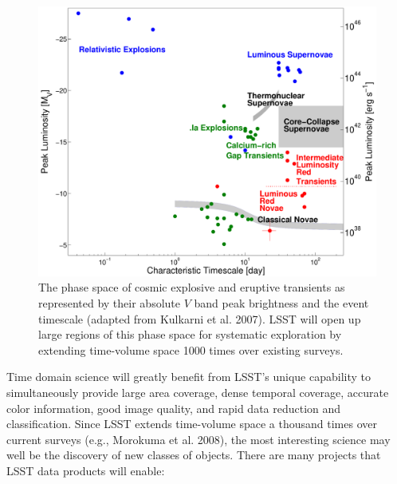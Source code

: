\documentclass{emulateapj}
\begin{document}
\begin{figure}
\hskip -0.1in
\vskip -0.1in
\includegraphics[width=1.0\hsize,clip]{taumv.pdf}
\caption{The phase space of cosmic explosive and eruptive transients as
represented by their absolute $V$ band peak brightness and the 
event timescale (adapted from Kulkarni et al. 2007). LSST will open up large 
regions of this phase space for systematic exploration by extending
time-volume space 1000 times over existing surveys.} 
\label{Fig:shri}
\end{figure}



Time domain science will greatly benefit from LSST's unique capability to simultaneously
provide large area coverage, dense temporal coverage, accurate color information,
good image quality, and rapid data reduction and classification. Since LSST extends 
time-volume space a thousand times over current surveys (e.g., Morokuma et al. 2008), 
the most interesting science may well be the discovery of new classes of objects.  
There are many projects that LSST data products will enable:
\end{document}
